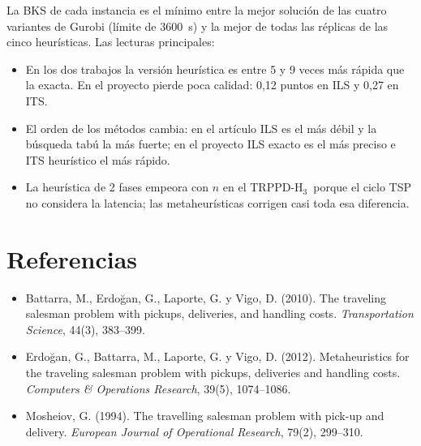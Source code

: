 \documentclass{article}
\newcommand{\TRPPDH}{TRPPD-H$_3$}
\begin{document}
\noindent La BKS de cada instancia es el mínimo entre la mejor solución de las cuatro variantes de Gurobi (límite de 3600~s) y la mejor de todas las réplicas de las cinco heurísticas. Las lecturas principales:
\begin{itemize}[leftmargin=*]
  \item En los dos trabajos la versión heurística es entre 5 y 9 veces más rápida que la exacta. En el proyecto pierde poca calidad: 0,12 puntos en ILS y 0,27 en ITS.
  \item El orden de los métodos cambia: en el artículo ILS es el más débil y la búsqueda tabú la más fuerte; en el proyecto ILS exacto es el más preciso e ITS heurístico el más rápido.
  \item La heurística de 2 fases empeora con $n$ en el \TRPPDH\ porque el ciclo TSP no considera la latencia; las metaheurísticas corrigen casi toda esa diferencia.
\end{itemize}

\section*{Referencias}
\begin{itemize}[leftmargin=*,label={}]
  \item Battarra, M., Erdoğan, G., Laporte, G. y Vigo, D. (2010). The traveling salesman problem with pickups, deliveries, and handling costs. \emph{Transportation Science}, 44(3), 383--399.
  \item Erdoğan, G., Battarra, M., Laporte, G. y Vigo, D. (2012). Metaheuristics for the traveling salesman problem with pickups, deliveries and handling costs. \emph{Computers \& Operations Research}, 39(5), 1074--1086.
  \item Mosheiov, G. (1994). The travelling salesman problem with pick-up and delivery. \emph{European Journal of Operational Research}, 79(2), 299--310.
\end{itemize}
\end{document}
